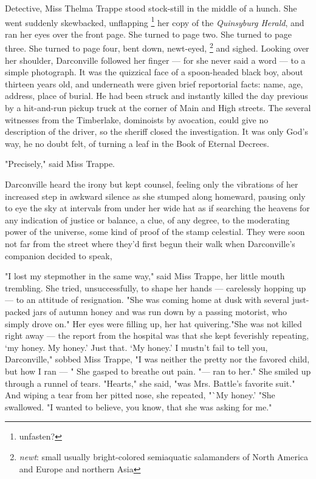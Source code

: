   Detective, Miss Thelma Trappe stood stock-still in the middle of a hunch. She
went suddenly skewbacked, unflapping 
\footnote{ \textdbend unfasten?}
her copy of the \textit{Quinsyburg Herald}, and ran
her eyes over the front page. She turned to page two. She turned to page three.
She turned to page four, bent down, newt-eyed, 
\footnote{ \textit{newt}: small usually bright-colored semiaquatic salamanders
  of North America and Europe and northern Asia}
and sighed. Looking over her
shoulder, Darconville followed her finger --- for she never said a word ---
to a simple photograph. It was the quizzical 
face of a spoon-headed black boy, about
thirteen years old, and underneath were given brief reportorial 
facts: name, age, address, place of burial. 
He had been struck and instantly killed the day
previous by a hit-and-run pickup truck at the corner of Main and High streets.
The several witnesses from the Timberlake, dominoists by avocation, could give
no description of the driver, so the sheriff closed the investigation. It was
only God's way, he no doubt felt, of turning a leaf in the Book of Eternal
Decrees.

  "Precisely," said Miss Trappe.

  Darconville heard the irony but kept counsel, feeling only the vibrations of
her increased step in awkward silence as she stumped along homeward, pausing
only to eye the sky at intervals from under her wide hat as if searching the
heavens for any indication of justice or balance, a clue, of any degree, to the
moderating power of the universe, some kind of proof of the stamp celestial.
They were soon not far from the street where they'd first begun their walk when
Darconville's companion decided to speak,

  "I lost my stepmother in the same way," said Miss Trappe, her little mouth
trembling. She tried, unsuccessfully, to shape her hands --- carelessly hopping
up --- to an attitude of resignation. "She was coming home at dusk with several
just-packed jars of autumn honey and was run down by a passing motorist, who
simply drove on." Her eyes were filling up, her hat quivering."She was not
killed right away --- the report from the hospital was that she kept feverishly
repeating, `my honey. My honey.' Just that. `My honey.' I mustn't fail to tell
you, Darconville," sobbed Miss Trappe, "I was neither the pretty nor the favored
child, but how I ran --- " She gasped to breathe out pain. "--- ran to her."
She smiled up through a runnel 
of tears. "Hearts," she said, "was Mrs. Battle's
favorite suit." And wiping a tear from her pitted nose, she repeated, "`My 
honey.' "She swallowed. "I wanted to believe, you know, that she was asking for 
me."

